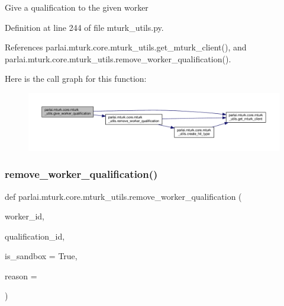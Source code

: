 \begin{DoxyVerb}Give a qualification to the given worker\end{DoxyVerb}
 

Definition at line 244 of file mturk\+\_\+utils.\+py.



References parlai.\+mturk.\+core.\+mturk\+\_\+utils.\+get\+\_\+mturk\+\_\+client(), and parlai.\+mturk.\+core.\+mturk\+\_\+utils.\+remove\+\_\+worker\+\_\+qualification().

Here is the call graph for this function\+:
\nopagebreak
\begin{figure}[H]
\begin{center}
\leavevmode
\includegraphics[width=350pt]{namespaceparlai_1_1mturk_1_1core_1_1mturk__utils_a640e2d9d121507f92649cccbd27e3af9_cgraph}
\end{center}
\end{figure}
\mbox{\label{namespaceparlai_1_1mturk_1_1core_1_1mturk__utils_a9221bb896f04cca6c0acac4bc127fdbf}} 
\subsubsection{\texorpdfstring{remove\+\_\+worker\+\_\+qualification()}{remove\_worker\_qualification()}}
{\footnotesize\ttfamily def parlai.\+mturk.\+core.\+mturk\+\_\+utils.\+remove\+\_\+worker\+\_\+qualification (\begin{DoxyParamCaption}\item[{}]{worker\+\_\+id,  }\item[{}]{qualification\+\_\+id,  }\item[{}]{is\+\_\+sandbox = {\ttfamily True},  }\item[{}]{reason = {\ttfamily \textquotesingle{}\textquotesingle{}} }\end{DoxyParamCaption})}

